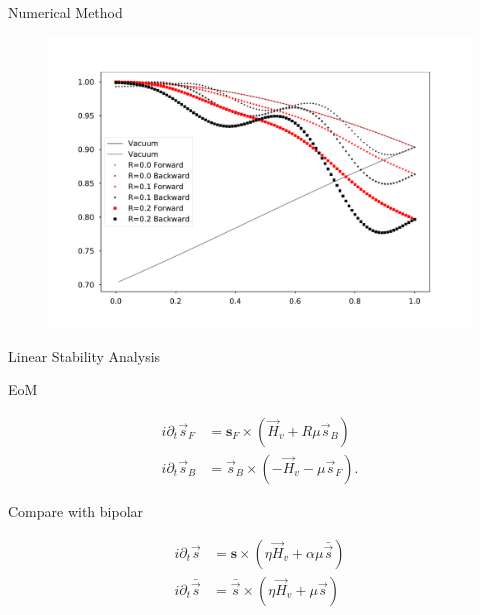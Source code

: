 \begin{frame}{Numerical Method}

\begin{tcolorbox}
   \begin{figure}
      \includegraphics[width=\textwidth]{assets/halo-mu-4-r-multiple}
   \end{figure}
\end{tcolorbox}

\end{frame}

\begin{frame}{Linear Stability Analysis}

EoM

   \begin{align*}
    i \partial_t \vec s_F &= \mathbf s_F \times (\vec {H}_v +R \mu \vec s_B) \\
      i\partial_t \vec s_B &= \vec s_B \times (- \vec H_v - \mu \vec s_F) .
   \end{align*}

Compare with bipolar

\begin{align*}
    i\partial_t \vec s &= \mathbf s \times ( \eta \vec H_v + \alpha \mu \bar{\vec s} )\\
    i\partial_t \bar{\vec s} &= \bar{\vec s} \times ( \eta \vec H_v + \mu \vec s )
\end{align*}


\end{frame}


